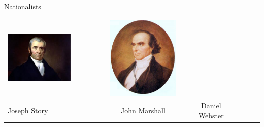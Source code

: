 \begin{frame}{Nationalists}
\begin{table}[h]
\begin{tabular}{lcccccc}
    \includegraphics[width=0.75\textwidth,height=.3\textheight,keepaspectratio=true]{img/marshall-portrait.png} &
    \includegraphics[width=0.75\textwidth,height=.3\textheight,keepaspectratio=true]{img/daniel-webster-portrait.png} \\
    Joseph Story &
    John Marshall &
    Daniel Webster &
\end{tabular}
\end{table}
\end{frame}

